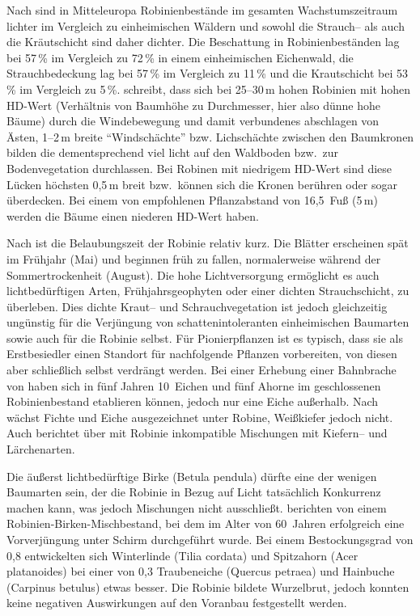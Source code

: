 \documentclass[twocolumn]{scrartcl}
\begin{document}
Nach \citet{hanzelka2015robinie} sind in Mitteleuropa Robinienbestände
im gesamten Wachstumszeitraum lichter im Vergleich zu einheimischen
Wäldern und sowohl die Strauch-- als auch die Kräutschicht sind daher
dichter. Die Beschattung in Robinienbeständen lag bei 57\,\% im
Vergleich zu 72\,\% in einem einheimischen Eichenwald, die
Strauchbedeckung lag bei 57\,\% im Vergleich zu 11\,\% und die
Krautschicht bei 53\,\% im Vergleich zu 5\,\%.
\citet[S.~47]{bluemke1955robinie} schreibt, dass sich bei 25--30\,m
hohen Robinien mit hohen HD-Wert
(Verhältnis von Baumhöhe zu Durchmesser, hier also dünne hohe Bäume)
durch die Windebewegung und damit
verbundenes abschlagen von Ästen, 1--2\,m breite \enquote{Windschächte}
bzw. Lichschächte zwischen den Baumkronen bilden die dementsprechend
viel licht auf den Waldboden bzw.\ zur Bodenvegetation durchlassen.
Bei Robinen mit niedrigem HD-Wert sind diese Lücken höchsten 0,5\,m
breit bzw.\ können sich die Kronen berühren oder sogar überdecken.
Bei einem von \cite{jessup1791robinie} empfohlenen Pflanzabstand
von 16,5~Fuß (5\,m) werden die Bäume einen niederen HD-Wert haben.

Nach \citet{vitkova2017robinie} ist die Belaubungszeit der Robinie
relativ kurz. Die Blätter erscheinen spät im Frühjahr (Mai) und
beginnen früh zu fallen, normalerweise während der Sommertrockenheit
(August). Die hohe Lichtversorgung ermöglicht es auch lichtbedürftigen
Arten, Frühjahrsgeophyten oder einer dichten Strauchschicht, zu
überleben. Dies dichte Kraut-- und Schrauchvegetation ist jedoch
gleichzeitig ungünstig für die Verjüngung von schattenintoleranten
einheimischen Baumarten sowie auch für die Robinie selbst. Für
Pionierpflanzen ist es typisch, dass sie als Erstbesiedler einen
Standort für nachfolgende Pflanzen vorbereiten, von diesen aber
schließlich selbst verdrängt werden. Bei einer Erhebung einer
Bahnbrache von \citet{kowarik1996robinie} haben sich in fünf Jahren
10~Eichen und fünf Ahorne im geschlossenen Robinienbestand etablieren
können, jedoch nur eine Eiche außerhalb.
Nach \citet[S.~138]{krauss1986sauenerWald} wächst Fichte und Eiche
ausgezeichnet unter Robine, Weißkiefer jedoch nicht. Auch
\citet{kellog1934robinieMischbestand} berichtet über mit Robinie
inkompatible Mischungen mit Kiefern-- und Lärchenarten.

Die äußerst lichtbedürftige Birke (Betula pendula) dürfte eine der
wenigen Baumarten sein, der die Robinie in Bezug auf Licht tatsächlich
Konkurrenz machen kann, was jedoch Mischungen nicht
ausschließt.
\citet{gaier2009robinieVorverjuengung} berichten von einem
Robinien-Birken-Mischbestand, bei dem im Alter von 60~Jahren
erfolgreich eine Vorverjüngung unter Schirm durchgeführt wurde.  Bei
einem Bestockungsgrad von 0,8 entwickelten sich Winterlinde (Tilia
cordata) und Spitzahorn (Acer platanoides) bei einer von 0,3
Traubeneiche (Quercus petraea) und Hainbuche (Carpinus betulus) etwas
besser.  Die Robinie bildete Wurzelbrut, jedoch konnten keine
negativen Auswirkungen auf den Voranbau festgestellt werden.
\end{document}
